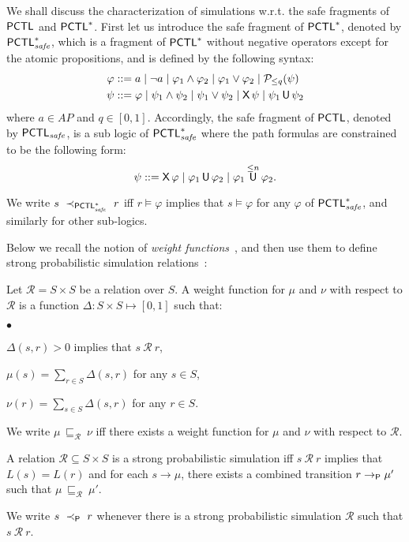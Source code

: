 \documentclass{LMCS}
\def\phi{\varphi}
\DeclareMathOperator{\U}{\text{\sf U}}
\DeclareMathOperator{\X}{\text{\sf X}}
\newcommand{\TRAN}[2]{#1\rightarrow #2}
\newcommand{\TRANP}[2]{#1\rightarrow_{{\sf P}}#2}
\newcommand{\Si}{\prec}
\newcommand{\AP}{\mathit{AP}}
\newcommand{\SP}{\ensuremath{\prec_{{\sf P}}}}
\newcommand{\PCTL}{{\sf PCTL}}
\newcommand{\PCTLS}{{\sf PCTL}^{*}}
\newcommand{\MC}[1]{\mathcal{#1}}
\newcommand{\MI}[1]{\mathit{#1}}
\newcommand{\DSI}[1][\MC{R}]{\sqsubseteq_{#1}}
\begin{document}
We shall discuss the characterization of simulations w.r.t. the safe
fragments of $\PCTL$ and $\PCTL^{*}$.  First let us introduce the safe
fragment of $\PCTLS$, denoted by $\PCTLS_{\MI{safe}}$, which is a
fragment of $\PCTLS$ without negative operators except for the atomic
propositions, and is defined by the following syntax:
\begin{align*}
\phi &::= a \mid\neg a\mid \phi_1\land\phi_2\mid \phi_1\lor\phi_2\mid\MC{P}_{\leq q}(\psi)\\
\psi &::=\phi\mid\psi_1\land\psi_2\mid\psi_1\lor\psi_2\mid\X\psi\mid\psi_1\U\psi_2
\end{align*}
where $a\in\AP$ and $q\in[0,1]$. Accordingly, the safe fragment of $\PCTL$, denoted by $\PCTL_{\MI{safe}}$,
is a sub logic of $\PCTLS_{\MI{safe}}$ where the path formulas are constrained to be the following form:
$$\psi::=\X\phi\mid\phi_1\U\phi_2 \mid\phi_1\U^{\le n}\phi_2.$$

We write $s~\Si_{\PCTLS_{\MI{safe}}}~r$ iff $r\models\phi$ implies that $s\models\phi$ for any $\phi$ of $\PCTLS_{\MI{safe}}$, and similarly for other sub-logics.

Below we recall the notion of \emph{weight
  functions}~\cite{jonsson1991specification}, and then use them to
define strong probabilistic simulation relations~\cite{SegalaL95}:
\begin{defi}\label{def:weight function}
Let $\MC{R}=S\times S$ be a relation over $S$. A weight function for $\mu$ and $\nu$ with respect to $\MC{R}$ is a function $\Delta:S\times S\mapsto[0,1]$ such that:
\begin{iteMize}{$\bullet$}
\item $\Delta(s,r)>0$ implies that $s~\MC{R}~r$,
\item $\mu(s)=\sum_{r\in S}\Delta(s,r)$ for any $s\in S$,
\item $\nu(r)=\sum_{s\in S}\Delta(s,r)$ for any $r\in S$.
\end{iteMize}
We write $\mu~\DSI~\nu$ iff there exists a weight function for $\mu$ and $\nu$ with respect to $\MC{R}$.
\end{defi}



\begin{defi}\label{def:strong probabilistic simulation}
A relation $\MC{R}\subseteq S\times S$ is a strong
probabilistic simulation iff $s~\MC{R}~r$ implies that $L(s)=L(r)$ and for each $\TRAN{s}{\mu}$, there exists a combined transition
$\TRANP{r}{\mu'}$ such that $\mu~\DSI~\mu'$.

We write $s~\SP~r$ whenever there is a strong
probabilistic simulation $\MC{R}$ such that $s~\MC{R}~r$.
\end{defi}
\end{document}
